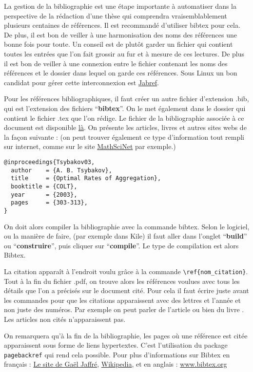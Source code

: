 

La gestion de la bibliographie est une étape importante à automatiser dans la perspective 
de la rédaction d'une thèse qui comprendra vraisemblablement plusieurs centaines de références.
Il est recommandé d'utiliser bibtex pour cela. De plus, il est bon de veiller à une harmonisation
des noms des références une bonne fois pour toute. Un conseil est de plutôt garder un fichier 
qui contient toutes les entrées que l'on fait grossir au fur et \`a mesure de ces lectures.
De plus il est bon de veiller à une connexion entre le fichier contenant les noms des références
et le dossier dans lequel on garde ces références. Sous Linux un bon candidat pour gérer
cette interconnexion est \href{http://jabref.sourceforge.net/}{Jabref}.


Pour les références bibliographiques,  il faut créer un autre fichier d'extension .bib, qui est 
l'extension des fichiers ``\textbf{bibtex}''. On le met également dans le dossier qui contient le 
fichier .tex que l'on rédige. Le fichier de la bibliographie associée à ce document est disponible
 \href{http://josephsalmon.eu/enseignement/M1/refs.bib}{là}.  On présente les articles, 
livres et autres sites webs de la façon suivante : (on peut trouver également ce type d'information
 tout rempli sur internet, comme sur le site \href{http://ams.u-strasbg.fr/mathscinet/}{MathSciNet}
 par exemple.)\medskip
\begin{lstlisting}
@inproceedings{Tsybakov03, 
  author    = {A. B. Tsybakov},
  title     = {Optimal Rates of Aggregation}, 
  booktitle = {COLT}, 
  year      = {2003}, 
  pages     = {303-313}, 
}
\end{lstlisting}

On doit alors compiler la bibliographie avec la commande bibtex. 
Selon le logiciel, ou la mani\`ere de faire,   (par exemple dans Kile) il faut aller dans l'onglet 
``\textbf{build}'' ou ``\textbf{construire}'', puis cliquer sur ``\textbf{compile}''. Le type de 
compilation est alors Bibtex.\medskip

La citation apparaît à l'endroit voulu grâce à la commande  \lstinline+\ref{nom_citation}+. 
Tout à la fin du fichier .pdf, on trouve alors  les références voulues avec tous les détails que l'on
 a précisés 
sur le document cité. 
Pour cela il faut  écrire juste avant \lstinline++ les commandes 
\lstinline++
\lstinline++ pour que les citations apparaissent avec des lettres et l'année
 et non juste des numéros. Par exemple on peut parler de l'article \cite{Tsybakov03} ou bien du livre 
\cite{Catoni04}. Les articles non cités n'apparaissent pas. \medskip

On remarquera qu'à la fin de la bibliographie, les pages où une référence est citée apparaissent sous
 forme de liens hypertextes. C'est l'utilisation du package \lstinline+pagebackref+ qui rend cela possible.
Pour plus d'informations sur Bibtex en français : 
\href{http://www.irit.fr/~Alain.Crouzil/jaffre/LOGICIELS/LATEX_BIBTEX/bibtex1.html}{Le site de Gaël Jaffré},
\href{http://fr.wikipedia.org/wiki/BibTeX}{Wikipedia},  
et en anglais :  \href{http://www.bibtex.org/}{www.bibtex.org} 

